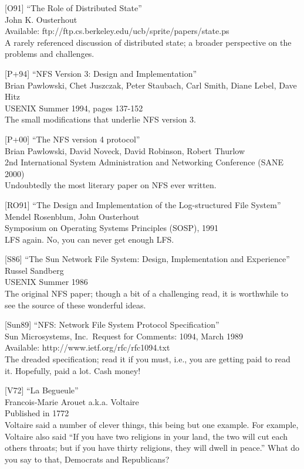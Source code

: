 {[}O91{]} ``The Role of Distributed State''\\
John K. Ousterhout\\
Available: ftp://ftp.cs.berkeley.edu/ucb/sprite/papers/state.ps\\
A rarely referenced discussion of distributed state; a broader
perspective on the problems and challenges.

{[}P+94{]} ``NFS Version 3: Design and Implementation''\\
Brian Pawlowski, Chet Juszczak, Peter Staubach, Carl Smith, Diane Lebel,
Dave Hitz\\
USENIX Summer 1994, pages 137-152\\
The small modifications that underlie NFS version 3.

{[}P+00{]} ``The NFS version 4 protocol''\\
Brian Pawlowski, David Noveck, David Robinson, Robert Thurlow\\
2nd International System Administration and Networking Conference (SANE
2000)\\
Undoubtedly the most literary paper on NFS ever written.

{[}RO91{]} ``The Design and Implementation of the Log-structured File
System''\\
Mendel Rosenblum, John Ousterhout\\
Symposium on Operating Systems Principles (SOSP), 1991\\
LFS again. No, you can never get enough LFS.

{[}S86{]} ``The Sun Network File System: Design, Implementation and
Experience''\\
Russel Sandberg\\
USENIX Summer 1986\\
The original NFS paper; though a bit of a challenging read, it is
worthwhile to see the source of these wonderful ideas.

{[}Sun89{]} ``NFS: Network File System Protocol Specification''\\
Sun Microsystems, Inc.~Request for Comments: 1094, March 1989\\
Available: http://www.ietf.org/rfc/rfc1094.txt\\
The dreaded specification; read it if you must, i.e., you are getting
paid to read it. Hopefully, paid a lot. Cash money!

{[}V72{]} ``La Begueule''\\
Francois-Marie Arouet a.k.a. Voltaire\\
Published in 1772\\
Voltaire said a number of clever things, this being but one example. For
example, Voltaire also said ``If you have two religions in your land,
the two will cut each others throats; but if you have thirty religions,
they will dwell in peace.'' What do you say to that, Democrats and
Republicans?

